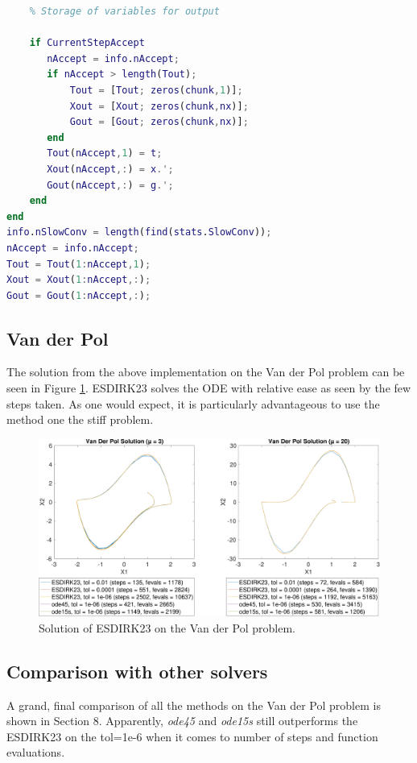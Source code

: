 \begin{adjustwidth*}{0cm}{-0.4cm}
\begin{lstlisting}[frame=single, language=Matlab,caption=ESDIRK23, label=ESDIRK23]
    %=====================================================================
    % Storage of variables for output
    
    if CurrentStepAccept
       nAccept = info.nAccept;
       if nAccept > length(Tout);
           Tout = [Tout; zeros(chunk,1)];
           Xout = [Xout; zeros(chunk,nx)];
           Gout = [Gout; zeros(chunk,nx)];
       end
       Tout(nAccept,1) = t;
       Xout(nAccept,:) = x.';
       Gout(nAccept,:) = g.';
    end
end
info.nSlowConv = length(find(stats.SlowConv));
nAccept = info.nAccept;
Tout = Tout(1:nAccept,1);
Xout = Xout(1:nAccept,:);
Gout = Gout(1:nAccept,:);
\end{lstlisting}
\end{adjustwidth*}

\subsection{Van der Pol}
The solution from the above implementation on the Van der Pol problem can be seen in Figure \ref{fig:7_4}. ESDIRK23 solves the ODE with relative ease as seen by the few steps taken. As one would expect, it is particularly advantageous to use the method one the stiff problem.

\begin{figure}[H]
    \centering
    \includegraphics[width=\textwidth]{plots/7_4b.pdf}
    \caption{Solution of ESDIRK23 on the Van der Pol problem.}
    \label{fig:7_4}
\end{figure}






\subsection{Comparison with other solvers}
A grand, final comparison of all the methods on the Van der Pol problem is shown in Section 8. Apparently, \textit{ode45} and \textit{ode15s} still outperforms the ESDIRK23 on the tol=1e-6 when it comes to number of steps and function evaluations.



